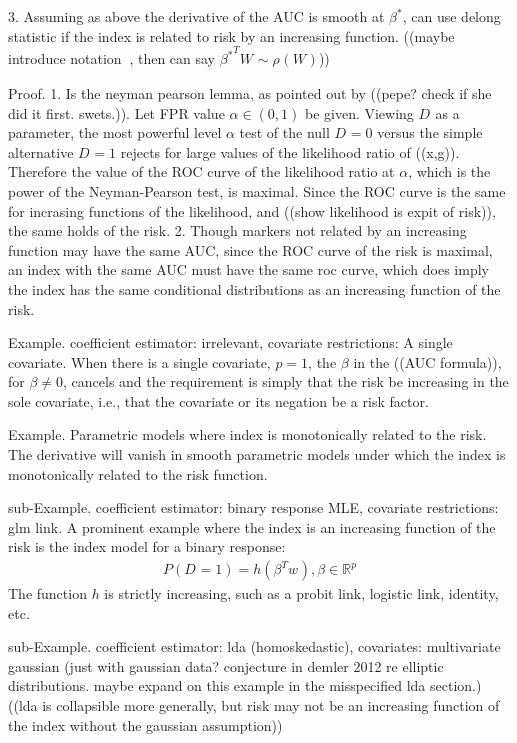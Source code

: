 \documentclass[12pt]{article}
\renewcommand{\P}{P}
\newcommand{\W}[1][]{W_{#1}}
\newcommand{\w}[1][]{w_{#1}}
\newcommand{\D}[1][]{D_{#1}}
\renewcommand{\t}[1]{{#1}^T}
\renewcommand{\star}[1]{{#1}^\ast}
\newcommand{\risk}[1][]{\rho_{#1}}
\newcommand{\h}{h}
\theoremstyle{definition}
\begin{document}
3. Assuming as above the derivative of the AUC is smooth at
$\star\beta$, can use delong statistic if the index is related to risk by
an increasing function. ((maybe introduce notation $~$, then can say $\t{\star\beta}\W \sim \risk(\W)$))

Proof. 1. Is the neyman pearson lemma, as pointed out by ((pepe? check
if she did it first. swets.)). Let FPR value $\alpha\in (0,1)$ be
given. Viewing $\D$ as a parameter, the most powerful level $\alpha$
test of the null $\D=0$ versus the simple alternative $\D=1$ rejects
for large values of the likelihood ratio of ((x,g)). Therefore the
value of the ROC curve of the likelihood ratio at $\alpha$, which is
the power of the Neyman-Pearson test, is maximal. Since the ROC curve is the same for
incrasing functions of the likelihood, and ((show likelihood is expit
of risk)), the same holds of the risk. 2. Though markers not related
by an increasing function may have the same AUC, since the ROC curve
of the risk is maximal, an index with the same AUC must have the same
roc curve, which does imply the index has the same conditional
distributions as an increasing function of the risk.

Example. coefficient estimator: irrelevant, covariate restrictions: A
single covariate. When there is a single covariate, $p=1$, the $\beta$
in the ((AUC formula)), for $\beta\neq 0$, cancels and the requirement is
simply that the risk be increasing in the sole covariate, i.e., that
the covariate or its negation be a risk
factor.%

Example. Parametric models where index is monotonically related to the
risk. The derivative will vanish in smooth parametric models under
which the index is monotonically related to the risk function.%


sub-Example. coefficient estimator: binary response MLE, covariate
restrictions: glm link. A prominent example where the index is an
increasing function of the risk is the index model for a binary
response:
\begin{align}
  \P(\D=1) = \h(\t\beta \w), \beta\in\mathbb{R}^p
\end{align}
The function $\h$ is strictly increasing, such as a probit link,
logistic link, identity, etc.

sub-Example. coefficient estimator: lda (homoskedastic), covariates:
multivariate gaussian (just with gaussian data? conjecture in demler
2012 re elliptic distributions. maybe expand on this example in the
misspecified lda section.) ((lda is collapsible more generally, but
risk may not be an increasing function of the index without the
gaussian assumption))
\end{document}

